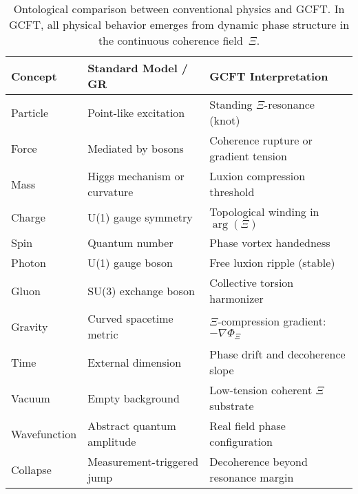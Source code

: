 \begin{table}[H]
\centering
\begin{tabular}{lll}
\toprule
\textbf{Concept} & \textbf{Standard Model / GR} & \textbf{GCFT Interpretation} \\
\midrule
Particle        & Point-like excitation               & Standing $\Xi$-resonance (knot) \\
Force           & Mediated by bosons                  & Coherence rupture or gradient tension \\
Mass            & Higgs mechanism or curvature        & Luxion compression threshold \\
Charge          & U(1) gauge symmetry                 & Topological winding in $\arg(\Xi)$ \\
Spin            & Quantum number                      & Phase vortex handedness \\
Photon          & U(1) gauge boson                    & Free luxion ripple (stable) \\
Gluon           & SU(3) exchange boson                & Collective torsion harmonizer \\
Gravity         & Curved spacetime metric             & $\Xi$-compression gradient: $-\nabla \Phi_\Xi$ \\
Time            & External dimension                  & Phase drift and decoherence slope \\
Vacuum          & Empty background                    & Low-tension coherent $\Xi$ substrate \\
Wavefunction    & Abstract quantum amplitude          & Real field phase configuration \\
Collapse        & Measurement-triggered jump          & Decoherence beyond resonance margin \\
\bottomrule
\end{tabular}
\caption{Ontological comparison between conventional physics and GCFT. In GCFT, all physical behavior emerges from dynamic phase structure in the continuous coherence field~$\Xi$.}
\label{tab:gcft_ontology_table}
\end{table}

